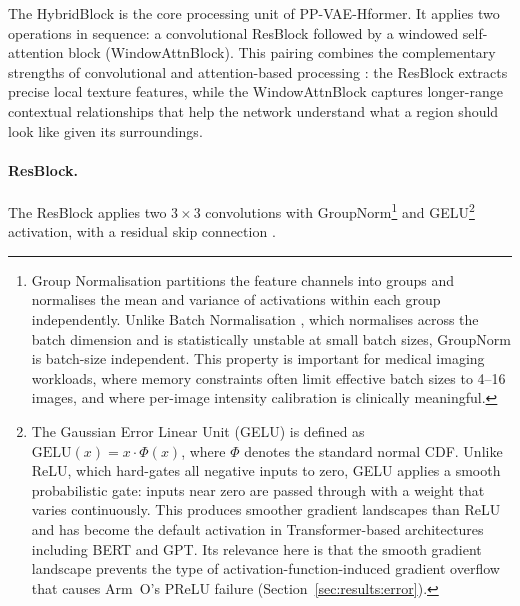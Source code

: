 \documentclass[12pt, a4paper, twoside, openright]{book}
\begin{document}
The HybridBlock is the core processing unit of PP-VAE-Hformer. It applies two operations
in sequence: a convolutional ResBlock followed by a windowed self-attention block
(WindowAttnBlock). This pairing combines the complementary strengths of convolutional
and attention-based processing \cite{zhang_hformer_2023}: the ResBlock extracts precise
local texture features, while the WindowAttnBlock captures longer-range contextual
relationships that help the network understand what a region should look like given its
surroundings.

\paragraph{ResBlock.}
The ResBlock applies two $3 \times 3$ convolutions with GroupNorm\footnote{Group Normalisation \cite{wu_group_2018} partitions the feature channels into groups and normalises the mean and variance of activations within each group independently. Unlike Batch Normalisation \cite{ioffe_batch_2015}, which normalises across the batch dimension and is statistically unstable at small batch sizes, GroupNorm is batch-size independent. This property is important for medical imaging workloads, where memory constraints often limit effective batch sizes to 4--16 images, and where per-image intensity calibration is clinically meaningful.} and GELU\footnote{The Gaussian Error Linear Unit (GELU) \cite{hendrycks_gaussian_2016} is defined as $\mathrm{GELU}(x) = x \cdot \Phi(x)$, where $\Phi$ denotes the standard normal CDF. Unlike ReLU, which hard-gates all negative inputs to zero, GELU applies a smooth probabilistic gate: inputs near zero are passed through with a weight that varies continuously. This produces smoother gradient landscapes than ReLU and has become the default activation in Transformer-based architectures including BERT \cite{devlin_bert_2019} and GPT. Its relevance here is that the smooth gradient landscape prevents the type of activation-function-induced gradient overflow that causes Arm~O's PReLU failure (Section~\ref{sec:results:error}).} activation, with a residual skip connection \cite{he_deep_2016}.


\end{document}
